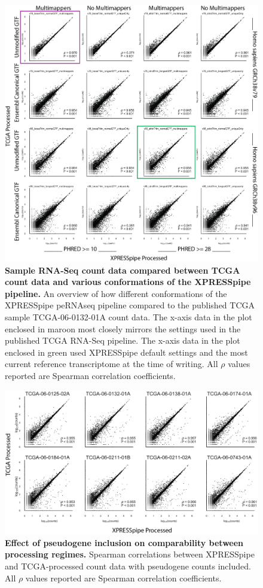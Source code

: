 \documentclass[10pt, oneside]{article}
\begin{document}
\begin{figure}
\centering
  \includegraphics[width=180mm]{figures/xpresspipe_supplement5.png}
  \caption{\textbf{Sample RNA-Seq count data compared between TCGA count data and various conformations of the XPRESSpipe pipeline.} An overview of how different conformations of the XPRESSpipe peRNAseq pipeline compared to the published TCGA sample TCGA-06-0132-01A count data. The x-axis data in the plot enclosed in maroon most closely mirrors the settings used in the published TCGA RNA-Seq pipeline. The x-axis data in the plot enclosed in green used XPRESSpipe default settings and the most current reference transcriptome at the time of writing. All $\rho$ values reported are Spearman correlation coefficients.}
  \label{fig:supplement5}
\end{figure}

\begin{figure}
\centering
  \includegraphics[width=180mm]{figures/xpresspipe_supplement6.png}
  \caption{\textbf{Effect of pseudogene inclusion on comparability between processing regimes.} Spearman correlations between XPRESSpipe and TCGA-processed count data with pseudogene counts included. All $\rho$ values reported are Spearman correlation coefficients.}
  \label{fig:supplement6}
\end{figure}
\end{document}
